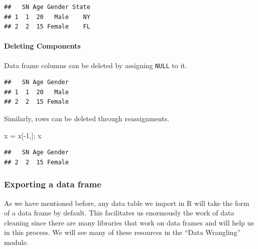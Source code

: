 \documentclass[
]{book}
\newenvironment{Shaded}{\begin{snugshade}}{\end{snugshade}}
\newcommand{\ConstantTok}[1]{\textcolor[rgb]{0.00,0.00,0.00}{#1}}
\newcommand{\DecValTok}[1]{\textcolor[rgb]{0.00,0.00,0.81}{#1}}
\newcommand{\FunctionTok}[1]{\textcolor[rgb]{0.00,0.00,0.00}{#1}}
\newcommand{\NormalTok}[1]{#1}
\newcommand{\OtherTok}[1]{\textcolor[rgb]{0.56,0.35,0.01}{#1}}
\newcommand{\SpecialCharTok}[1]{\textcolor[rgb]{0.00,0.00,0.00}{#1}}
\newcommand{\StringTok}[1]{\textcolor[rgb]{0.31,0.60,0.02}{#1}}
\begin{document}
\begin{Shaded}
\end{Shaded}

\begin{verbatim}
##   SN Age Gender State
## 1  1  20   Male    NY
## 2  2  15 Female    FL
\end{verbatim}

\hypertarget{deleting-components}{%
\paragraph{Deleting Components}\label{deleting-components}}

Data frame columns can be deleted by assigning \texttt{NULL} to it.

\begin{Shaded}
\end{Shaded}

\begin{verbatim}
##   SN Age Gender
## 1  1  20   Male
## 2  2  15 Female
\end{verbatim}

Similarly, rows can be deleted through reassignments.

\begin{Shaded}
\begin{Highlighting}[]
\NormalTok{x }\OtherTok{=}\NormalTok{ x[}\SpecialCharTok{{-}}\DecValTok{1}\NormalTok{,]; x}
\end{Highlighting}
\end{Shaded}

\begin{verbatim}
##   SN Age Gender
## 2  2  15 Female
\end{verbatim}

\hypertarget{exporting-a-data-frame}{%
\subsubsection{Exporting a data frame}\label{exporting-a-data-frame}}

As we have mentioned before, any data table we import in R will take the form of a data frame by default. This facilitates us enormously the work of data cleaning since there are many libraries that work on data frames and will help us in this process. We will see many of these resources in the ``Data Wrangling'' module.
\end{document}
